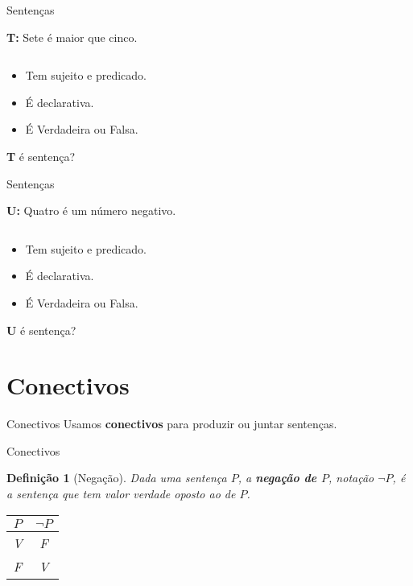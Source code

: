 \documentclass[10pt]{beamer}
\renewcommand{\indent}{\hspace*{2em}}
\theoremstyle{plain}
\newtheorem{defn}{Definição}[section]
\begin{document}
\begin{frame}{Sentenças}
    \begin{block}{}
     \textbf{T:} Sete é maior que cinco.
    \end{block}
    $ $
\begin{itemize}
    \item Tem sujeito e predicado.
    \item É declarativa.
    \item É Verdadeira ou Falsa.
\end{itemize}
$$$$
\textbf{T} é sentença?
\end{frame}

\begin{frame}{Sentenças}
    \begin{block}{}
     \textbf{U:} Quatro é um número negativo.
    \end{block}
    $ $
\begin{itemize}
    \item Tem sujeito e predicado.
    \item É declarativa.
    \item É Verdadeira ou Falsa.
\end{itemize}
$$$$
\textbf{U} é sentença?
\end{frame}

\section{Conectivos}

\begin{frame}{Conectivos}
    \indent Usamos \textbf{conectivos} para produzir ou juntar sentenças.
\end{frame}

\begin{frame}{Conectivos}
    \begin{defn}[Negação]
        \vfill\indent Dada uma sentença $P$, a \textbf{negação de $P$}, notação $\neg P$, é a sentença que tem valor verdade oposto ao de $P$.
        \begin{center}
            \begin{tabular}{|c|c|}
    \hline
    $P$ & $\neg P$ \\
    \hline
    V & F \\
    \hline
    F & V \\
    \hline
\end{tabular}
        \end{center}
    \end{defn}
\end{frame}
\end{document}
